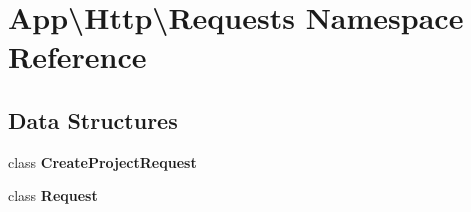 \section{App\textbackslash{}Http\textbackslash{}Requests Namespace Reference}
\label{namespace_app_1_1_http_1_1_requests}
\subsection*{Data Structures}
\begin{DoxyCompactItemize}
\item 
class {\bf Create\+Project\+Request}
\item 
class {\bf Request}
\end{DoxyCompactItemize}
